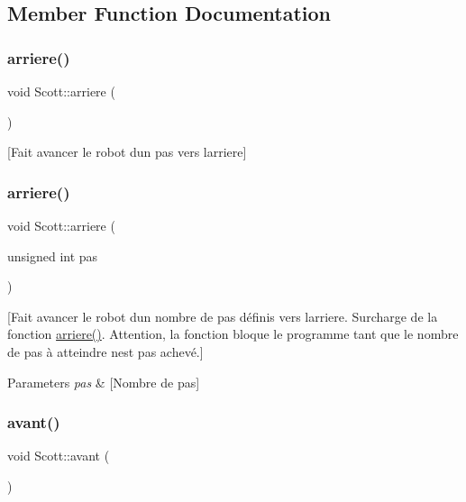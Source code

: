\subsection{Member Function Documentation}
\hypertarget{class_scott_aa61eeb821a3dcbaa8785f69ead328d99}{}\label{class_scott_aa61eeb821a3dcbaa8785f69ead328d99} 
\subsubsection{\texorpdfstring{arriere()}{arriere()}\hspace{0.1cm}{\footnotesize\ttfamily [1/2]}}
{\footnotesize\ttfamily void Scott\+::arriere (\begin{DoxyParamCaption}{ }\end{DoxyParamCaption})}

\mbox{[}Fait avancer le robot d\textquotesingle{}un pas vers l\textquotesingle{}arriere\mbox{]} \hypertarget{class_scott_a9588bb8f527008d129612593cdf4b3c7}{}\label{class_scott_a9588bb8f527008d129612593cdf4b3c7} 
\subsubsection{\texorpdfstring{arriere()}{arriere()}\hspace{0.1cm}{\footnotesize\ttfamily [2/2]}}
{\footnotesize\ttfamily void Scott\+::arriere (\begin{DoxyParamCaption}\item[{unsigned int}]{pas }\end{DoxyParamCaption})}

\mbox{[}Fait avancer le robot d\textquotesingle{}un nombre de pas définis vers l\textquotesingle{}arriere. Surcharge de la fonction \hyperlink{class_scott_aa61eeb821a3dcbaa8785f69ead328d99}{arriere()}. Attention, la fonction bloque le programme tant que le nombre de pas à atteindre n\textquotesingle{}est pas achevé.\mbox{]} 
\begin{DoxyParams}{Parameters}
{\em pas} & \mbox{[}Nombre de pas\mbox{]} \\
\hline
\end{DoxyParams}
\hypertarget{class_scott_aba59b4c4ed89d7c2ce178498a177f5ed}{}\label{class_scott_aba59b4c4ed89d7c2ce178498a177f5ed} 
\subsubsection{\texorpdfstring{avant()}{avant()}\hspace{0.1cm}{\footnotesize\ttfamily [1/2]}}
{\footnotesize\ttfamily void Scott\+::avant (\begin{DoxyParamCaption}{ }\end{DoxyParamCaption})}

